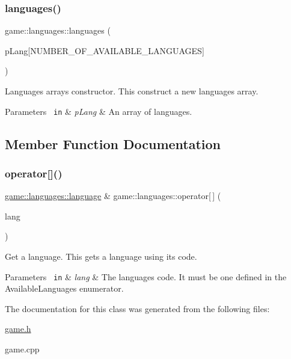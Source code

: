 \subsubsection{\texorpdfstring{languages()}{languages()}}
{\footnotesize\ttfamily game\+::languages\+::languages (\begin{DoxyParamCaption}\item[{const \mbox{\hyperlink{structgame_1_1languages_1_1language}{language}}(\&)}]{p\+Lang\mbox{[}\+N\+U\+M\+B\+E\+R\+\_\+\+O\+F\+\_\+\+A\+V\+A\+I\+L\+A\+B\+L\+E\+\_\+\+L\+A\+N\+G\+U\+A\+G\+E\+S\mbox{]} }\end{DoxyParamCaption})\hspace{0.3cm}{\ttfamily [noexcept]}}



Languages\textquotesingle{} array\textquotesingle{}s constructor. This construct a new languages\textquotesingle{} array. 


\begin{DoxyParams}[1]{Parameters}
\mbox{\texttt{ in}}  & {\em p\+Lang} & An array of languages. \\
\hline
\end{DoxyParams}


\subsection{Member Function Documentation}
\mbox{\label{classgame_1_1languages_a8f26423a4e6cc1f3a0a6e386d9129a22}} 
\subsubsection{\texorpdfstring{operator[]()}{operator[]()}}
{\footnotesize\ttfamily \mbox{\hyperlink{structgame_1_1languages_1_1language}{game\+::languages\+::language}} \& game\+::languages\+::operator\mbox{[}$\,$\mbox{]} (\begin{DoxyParamCaption}\item[{\mbox{\hyperlink{classgame_1_1languages_ad965ce3a9fdce02ab3caba6301f221eb}{Available\+Languages}}}]{lang }\end{DoxyParamCaption})\hspace{0.3cm}{\ttfamily [noexcept]}}



Get a language. This gets a language using its code. 


\begin{DoxyParams}[1]{Parameters}
\mbox{\texttt{ in}}  & {\em lang} & The language\textquotesingle{}s code. It must be one defined in the Available\+Languages enumerator. \\
\hline
\end{DoxyParams}


The documentation for this class was generated from the following files\+:\begin{DoxyCompactItemize}
\item 
\mbox{\hyperlink{game_8h}{game.\+h}}\item 
game.\+cpp\end{DoxyCompactItemize}
